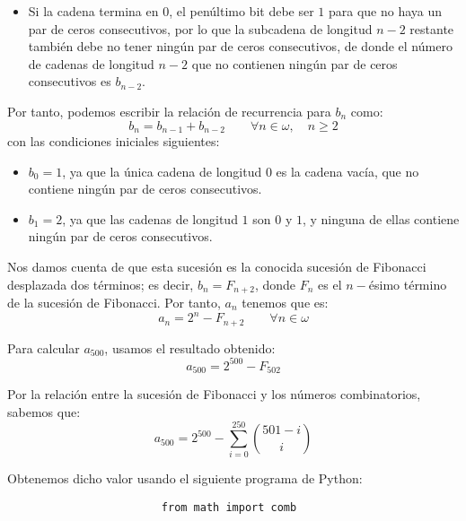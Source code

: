 \documentclass[12pt]{article}
\begin{document}
\begin{ejercicio}
\begin{enumerate}
\begin{itemize}
                \item Si la cadena termina en $0$, el penúltimo bit debe ser $1$ para que no haya un par de ceros consecutivos, por lo que la subcadena de longitud $n-2$
                restante también debe no tener ningún par de ceros consecutivos, de donde el número de cadenas de longitud $n-2$ que no contienen ningún par de ceros consecutivos
                es $b_{n-2}$.
            \end{itemize}

            Por tanto, podemos escribir la relación de recurrencia para $b_n$ como:
            \begin{equation*}
                b_n = b_{n-1} + b_{n-2} \qquad \forall n\in \omega, \quad n\geq 2
            \end{equation*}
            con las condiciones iniciales siguientes:
            \begin{itemize}
                \item $b_0 = 1$, ya que la única cadena de longitud $0$ es la cadena vacía, que no contiene ningún par de ceros consecutivos.
                \item $b_1 = 2$, ya que las cadenas de longitud $1$ son $0$ y $1$, y ninguna de ellas contiene ningún par de ceros consecutivos.
            \end{itemize}

            Nos damos cuenta de que esta sucesión es la conocida sucesión de Fibonacci desplazada dos términos; es decir, $b_n = F_{n+2}$, donde $F_n$ es el $n-$ésimo término de la sucesión de Fibonacci.
            Por tanto, $a_n$ tenemos que es:
            \begin{equation*}
                a_n = 2^n - F_{n+2} \qquad \forall n\in \omega
            \end{equation*}
            
            Para calcular $a_{500}$, usamos el resultado obtenido:
            \begin{equation*}
                a_{500} = 2^{500} - F_{502}
            \end{equation*}

            Por la relación entre la sucesión de Fibonacci y los números combinatorios, sabemos que:
            \begin{equation*}
                a_{500} = 2^{500} - \sum_{i=0}^{250} \binom{501-i}{i}
            \end{equation*}

            Obtenemos dicho valor usando el siguiente programa de Python:
            \begin{listing}[H]
                \begin{verbatim}
                        from math import comb


\end{verbatim}
\end{listing}
\end{enumerate}
\end{ejercicio}
\end{document}
